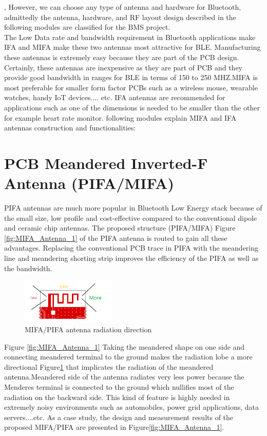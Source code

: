 \indent, However, we can choose any type of antenna and hardware for Bluetooth, admittedly the antenna, hardware, and RF layout design described in the following modules are classified for the BMS project.\\
\indent The Low Data rate and bandwidth requirement in Bluetooth applications make IFA and MIFA make these two antennas most attractive for BLE.  Manufacturing these antennas is extremely easy because they are part of the PCB design. Certainly, these antennas are inexpensive as they are part of PCB and they provide good bandwidth in ranges for BLE in terms of 150 to 250 MHZ.MIFA is most preferable for smaller form factor PCBs such as a wireless mouse, wearable watches, handy IoT devices.... etc. IFA antennas are recommended for applications such as one of the dimensions is needed to be smaller than the other for example heart rate monitor.
following modules explain MIFA and IFA antennas construction and functionalities:

\section{PCB Meandered Inverted-F Antenna (PIFA/MIFA)}

PIFA antennas are much more popular in Bluetooth Low Energy stack because of the small size, low profile and cost-effective compared to the conventional dipole and ceramic chip antennas.
The proposed structure (PIFA/MIFA) Figure \ref{fig:MIFA_Antenna_1} of the PIFA antenna is routed to gain all these advantages.
Replacing the conventional PCB trace in PIFA with the meandering line and meandering shorting strip
improves the efficiency of the PIFA as well as the bandwidth. 
\begin{figure}[h]
	\centering
	\includegraphics[width=0.4\textwidth]{Chap03/Figures/MIFA_Antenna_radiation_direction.PNG}
	\caption{MIFA/PIFA antenna radiation direction}
	\label{fig:MIFA_RADIATION_DIRECTION}
\end{figure}

Figure \ref{fig:MIFA_Antenna_1} Taking the meandered shape on one side and connecting meandered terminal to the ground makes the radiation lobe a more directional Figure\ref{fig:MIFA_RADIATION_DIRECTION} that implicates the radiation of the meandered antenna.Meandered side of the antenna radiates very less power because the Menderes terminal is connected to the ground which nullifies most of the radiation on the backward side. This kind of feature is highly needed in extremely noisy environments such as automobiles, power grid applications, data servers....etc.
As a case study, the design and measurement results of the
proposed MIFA/PIFA are presented \cite{PIFA2017Cheuk} in Figure\ref{fig:MIFA_Antenna_1}.


